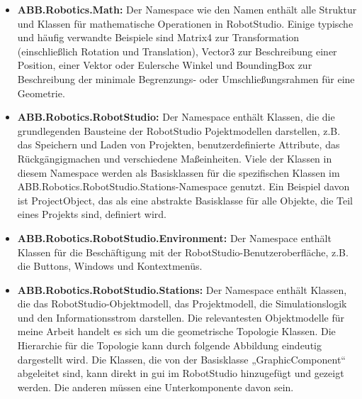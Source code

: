 \documentclass[14pt,a4paper,titlepage]{article}
\begin{document}
			\begin{itemize}
				\item
				\textbf{ABB.Robotics.Math:}
				Der Namespace wie den Namen enthält alle Struktur und Klassen für mathematische Operationen in RobotStudio. Einige typische und häufig verwandte Beispiele sind Matrix4 zur Transformation (einschließlich Rotation und Translation), Vector3 zur Beschreibung einer Position, einer Vektor oder Eulersche Winkel und BoundingBox zur Beschreibung der minimale Begrenzungs- oder Umschließungsrahmen für eine Geometrie. 
				
				\item
				\textbf{ABB.Robotics.RobotStudio:}
				Der Namespace enthält Klassen, die die grundlegenden Bausteine der RobotStudio Pojektmodellen darstellen, z.B. das Speichern und Laden von Projekten, benutzerdefinierte Attribute, das Rückgängigmachen und verschiedene Maßeinheiten. Viele der Klassen in diesem Namespace werden als Basisklassen für die spezifischen Klassen im ABB.Robotics.RobotStudio.Stations-Namespace genutzt. Ein Beispiel davon ist ProjectObject, das als eine abstrakte Basisklasse für alle Objekte, die Teil eines Projekts sind, definiert wird.
				
				\item
				\textbf{ABB.Robotics.RobotStudio.Environment:}
				Der Namespace enthält Klassen für die Beschäftigung mit der RobotStudio-Benutzeroberfläche, z.B. die Buttons, Windows und Kontextmenüs.
				
				\item
				\textbf{ABB.Robotics.RobotStudio.Stations:}
				Der Namespace enthält Klassen, die das RobotStudio-Objektmodell, das Projektmodell, die Simulationslogik und den Informationsstrom darstellen. Die relevantesten Objektmodelle für meine Arbeit handelt es sich um die geometrische Topologie Klassen. Die Hierarchie für die Topologie kann durch folgende Abbildung eindeutig dargestellt wird. Die Klassen, die von der Basisklasse „GraphicComponent“ abgeleitet sind, kann direkt in \ac{gui} im RobotStudio hinzugefügt und gezeigt werden. Die anderen müssen eine Unterkomponente davon sein. 


\end{itemize}
\end{document}
